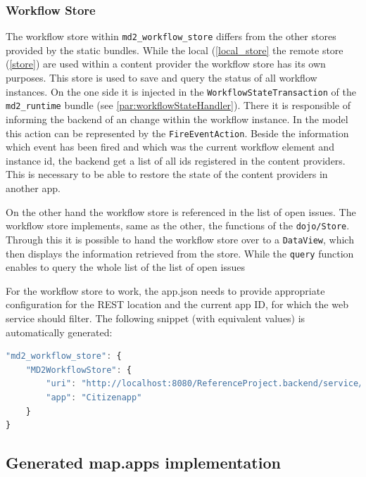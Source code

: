 \subsubsection{Workflow Store} \label{workflow_store}

The workflow store within \lstinline|md2_workflow_store| differs from the other stores provided by the static bundles. While the local (\cref{local_store} the remote store (\cref{store}) are used within a content provider the workflow store has its own purposes. This store is used to save and query the status of all workflow instances. On the one side it is injected in the \lstinline|WorkflowStateTransaction| of the \lstinline|md2_runtime| bundle (see \cref{par:workflowStateHandler}). There it is responsible of informing the backend of an change within the workflow instance. In the model this action can be represented by the \lstinline|FireEventAction|. Beside the information which event has been fired and which was the current workflow element and instance id, the backend get a list of all ids registered in the content providers. This is necessary to be able to restore the state of the content providers in another app.

On the other hand the workflow store is referenced in the list of open issues. The workflow store implements, same as the other, the functions of the \lstinline|dojo/Store|. Through this it is possible to hand the workflow store over to a \lstinline|DataView|, which then displays the information retrieved from the store. While the \lstinline|query| function enables to query the whole list of the list of open issues

For the workflow store to work, the app.json needs to provide appropriate configuration for the REST location and the current app ID, for which the web service should filter. The following snippet (with equivalent values) is automatically generated:
\begin{lstlisting}[language=Javascript]
"md2_workflow_store": {
	"MD2WorkflowStore": {
		"uri": "http://localhost:8080/ReferenceProject.backend/service/workflowState/",
		"app": "Citizenapp"
	}
}
\end{lstlisting}


\subsection{Generated map.apps implementation} 



